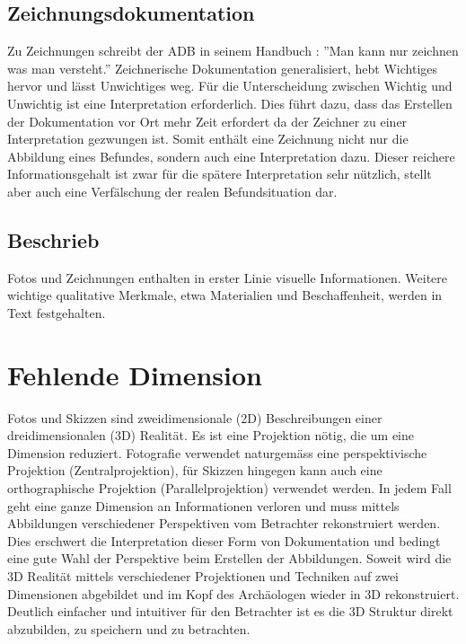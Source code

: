 		\subsection{Zeichnungsdokumentation}
			Zu Zeichnungen schreibt der ADB in seinem Handbuch \cite{adb:handbuch}: ''Man kann nur zeichnen was man versteht.''
			Zeichnerische Dokumentation generalisiert, hebt Wichtiges hervor und lässt Unwichtiges weg. Für die Unterscheidung zwischen Wichtig und Unwichtig ist eine Interpretation erforderlich.
			Dies führt dazu, dass das Erstellen der Dokumentation vor Ort mehr Zeit erfordert da der Zeichner zu einer Interpretation gezwungen ist. Somit enthält eine Zeichnung nicht nur die Abbildung eines Befundes, sondern auch eine Interpretation dazu. Dieser reichere Informationsgehalt ist zwar für die spätere Interpretation sehr nützlich, stellt aber auch eine Verfälschung der realen Befundsituation dar.
			
		\subsection{Beschrieb}
			Fotos und Zeichnungen enthalten in erster Linie visuelle Informationen. Weitere wichtige qualitative Merkmale, etwa Materialien und Beschaffenheit, werden in Text festgehalten.
		
			
	\section{Fehlende Dimension}
		Fotos und Skizzen sind zweidimensionale (2D) Beschreibungen einer dreidimensionalen (3D) Realität. Es ist eine Projektion nötig, die um eine Dimension reduziert. Fotografie verwendet naturgemäss eine perspektivische Projektion (Zentralprojektion), für Skizzen hingegen kann auch eine orthographische Projektion (Parallelprojektion) verwendet werden.
		In jedem Fall geht eine ganze Dimension an Informationen verloren und muss mittels Abbildungen verschiedener Perspektiven vom Betrachter rekonstruiert werden.
		Dies erschwert die Interpretation dieser Form von Dokumentation und bedingt eine gute Wahl der Perspektive beim Erstellen der Abbildungen.
		Soweit wird die 3D Realität mittels verschiedener Projektionen und Techniken auf zwei Dimensionen abgebildet und im Kopf des Archäologen wieder in 3D rekonstruiert.
		Deutlich einfacher und intuitiver für den Betrachter ist es die 3D Struktur direkt abzubilden, zu speichern und zu betrachten.